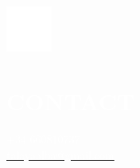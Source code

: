 \documentclass[../main.tex]{subfiles}
\begin{document}
    \hspace*{0.2cm}
    \begin{minipage}[t]{2cm}
        \vspace*{0.75cm}\includegraphics[width=1.5cm]{assets/contact.png}
    \end{minipage}
    \begin{minipage}[t]{5cm}
        \vspace*{0.75cm}

        \section*{\textcolor{white}{CONTACT}}
        \vspace*{-0.25cm}
        \textcolor{white}{
            +34 660810737 \\
            \underline{\href{mailto:talayaalba@gmail.com}{\textcolor{white}{talayaalba@gmail.com}}}
        }
    \end{minipage}
\end{document}
